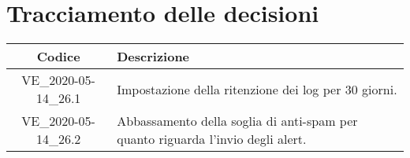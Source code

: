 \section*{Tracciamento delle decisioni}

\begin{center}
	\begin{longtable}{|c|p{12.25cm}|}
	\hline
	\rowcolor{lighter-grayer}
	\textbf{Codice} & \textbf{Descrizione} \\
	\hline
	\endfirsthead

	\hline
	VE\_2020-05-14\_26.1 & Impostazione della ritenzione dei log per 30 giorni. \\
	VE\_2020-05-14\_26.2 & Abbassamento della soglia di anti-spam per quanto riguarda l'invio degli alert. \\
	\hline

	\end{longtable}
\end{center}

